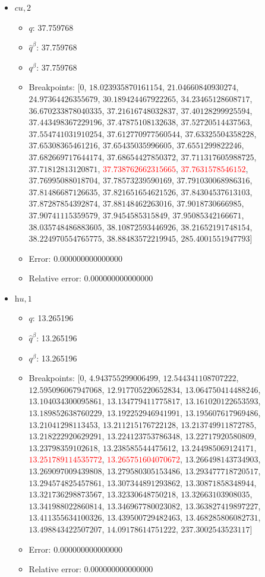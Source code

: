 \documentclass{article}%
\begin{document}
\begin{itemize}
\begin{itemize}
		\item Error: 0.000000000000000%
		\item Relative error: 0.000000000000000%
	\end{itemize}%
	\item $\textit{cu},2$%
	\begin{itemize}%
		\item $q$: 37.759768%
		\item $\hat{q}^\beta$: 37.759768%
		\item $q^\beta$: 37.759768%
		\item Breakpoints: $[$$0$, $18.023935870161154$, $21.04660840930274$, $24.97364426355679$, $30.189424467922265$, $34.23465128608717$, $36.670233878040335$, $37.21616748032837$, $37.40128299925594$, $37.443498367229196$, $37.47875108132638$, $37.52720514437563$, $37.554741031910254$, $37.612770977560544$, $37.63325504358228$, $37.65308365461216$, $37.65435035996605$, $37.6551299822246$, $37.682669717644174$, $37.68654427850372$, $37.711317605988725$, $37.71812813120871$, \textcolor{red}{$37.738762662315665$}, \textcolor{red}{$37.7631578546152$}, $37.76995088018704$, $37.78573239590169$, $37.791030068986316$, $37.81486687126635$, $37.821651654621526$, $37.84304537613103$, $37.87287854392874$, $37.88148462263016$, $37.9018730666985$, $37.90741115359579$, $37.9454585315849$, $37.95085342166671$, $38.035748486883605$, $38.10872593446926$, $38.21652191748154$, $38.224970554765775$, $38.88483572219945$, $285.4001551947793$$]$%
		\item Error: 0.000000000000000%
		\item Relative error: 0.000000000000000%
	\end{itemize}%
	\item $\textit{hu},1$%
	\begin{itemize}%
		\item $q$: 13.265196%
		\item $\hat{q}^\beta$: 13.265196%
		\item $q^\beta$: 13.265196%
		\item Breakpoints: $[$$0$, $4.943755299006499$, $12.544341108707222$, $12.595096067947068$, $12.917705220652834$, $13.064750414488246$, $13.104034300095861$, $13.134779411775817$, $13.161020122653593$, $13.189852638760229$, $13.192252946941991$, $13.195607617969486$, $13.21041298113453$, $13.211215176722128$, $13.213749911872785$, $13.218222920629291$, $13.224123753786348$, $13.22717920580809$, $13.23798359102618$, $13.238585544475612$, $13.244985069124171$, \textcolor{red}{$13.251789114535772$}, \textcolor{red}{$13.265751604070672$}, $13.266498143734903$, $13.269097009439808$, $13.279580305153486$, $13.293477718720517$, $13.294574825457861$, $13.307344891293862$, $13.30871858348944$, $13.321736298873567$, $13.32330648750218$, $13.32663103908035$, $13.341988022860814$, $13.346967780023082$, $13.363827419897227$, $13.411355634100326$, $13.439500729482463$, $13.468285806082731$, $13.498843422507207$, $14.09178614751222$, $237.3002543523117$$]$%
		\item Error: 0.000000000000000%
		\item Relative error: 0.000000000000000%
	\end{itemize}%
\end{itemize}%
\end{document}
